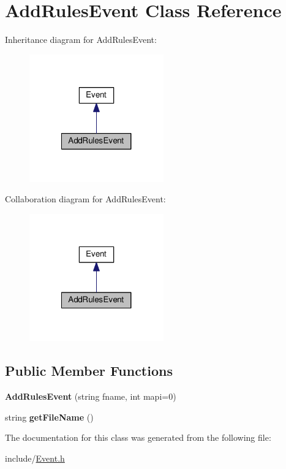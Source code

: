 \hypertarget{classAddRulesEvent}{}\section{Add\+Rules\+Event Class Reference}
\label{classAddRulesEvent}


Inheritance diagram for Add\+Rules\+Event\+:
\nopagebreak
\begin{figure}[H]
\begin{center}
\leavevmode
\includegraphics[width=164pt]{classAddRulesEvent__inherit__graph}
\end{center}
\end{figure}


Collaboration diagram for Add\+Rules\+Event\+:
\nopagebreak
\begin{figure}[H]
\begin{center}
\leavevmode
\includegraphics[width=164pt]{classAddRulesEvent__coll__graph}
\end{center}
\end{figure}
\subsection*{Public Member Functions}
\begin{DoxyCompactItemize}
\item 
\mbox{\label{classAddRulesEvent_a6d3283dfa65c6bacd49d94fcb891b206}} 
{\bfseries Add\+Rules\+Event} (string fname, int mapi=0)
\item 
\mbox{\label{classAddRulesEvent_a139cf1cfd341da0a1b2dd377416fbf80}} 
string {\bfseries get\+File\+Name} ()
\end{DoxyCompactItemize}


The documentation for this class was generated from the following file\+:\begin{DoxyCompactItemize}
\item 
include/\hyperlink{Event_8h}{Event.\+h}\end{DoxyCompactItemize}

